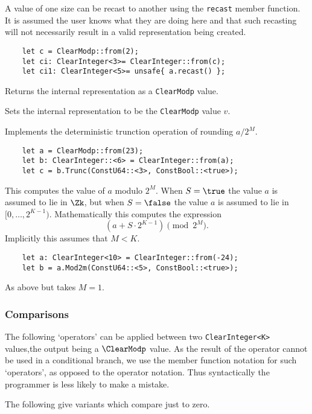 A value of one size can be recast to another using the \verb|recast|
member function. It is assumed the user knows what they are doing here
and that such recasting will not necessarily result in a valid representation
being created.
\begin{lstlisting}
    let c = ClearModp::from(2);
    let ci: ClearInteger<3>= ClearInteger::from(c);
    let ci1: ClearInteger<5>= unsafe{ a.recast() };
\end{lstlisting}

Returns the internal representation as a \verb|ClearModp| value.

Sets the internal representation to be the \verb|ClearModp| value $v$.

Implements the deterministic trunction operation of rounding $a/2^M$.
\begin{lstlisting}
    let a = ClearModp::from(23);
    let b: ClearInteger::<6> = ClearInteger::from(a);
    let c = b.Trunc(ConstU64::<3>, ConstBool::<true>);
\end{lstlisting}

This computes the value of $a$ modulo $2^M$.
When $S=\true$ the value $a$ is assumed to lie in $\Zk$,
but when $S=\false$ the value $a$ is assumed to lie in $[0,\ldots,2^{K-1})$.
Mathematically this computes the expression
\[  \left( a + S \cdot 2^{K-1} \right) \pmod 2^M. \]
Implicitly this assumes that $M < K$.
\begin{lstlisting}
    let a: ClearInteger<10> = ClearInteger::from(-24);
    let b = a.Mod2m(ConstU64::<5>, ConstBool::<true>);
\end{lstlisting}

As above but takes $M=1$.

\subsubsection{Comparisons}
The following `operators' can be applied between two \verb|ClearInteger<K>|
values,the output being a $\ClearModp$ value.
As the result of the operator cannot be used in a conditional branch,
we use the member function notation for such `operators', as opposed
to the operator notation. Thus syntactically the programmer is less
likely to make a mistake.

\noindent
The following give variants which compare just to zero.




